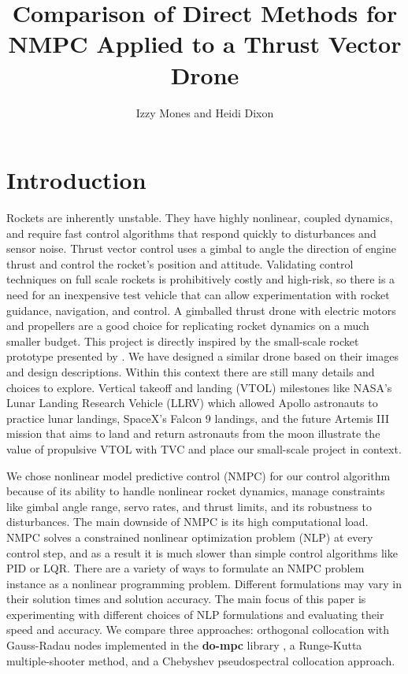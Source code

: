 \documentclass[]{article}
\title{Comparison of Direct Methods for NMPC  Applied to  a Thrust Vector Drone}
\author{Izzy Mones and Heidi Dixon}
\begin{document}
\maketitle
	
	\section*{Introduction}	
		Rockets are inherently unstable. They have highly nonlinear, coupled dynamics,  and require fast control algorithms that respond quickly to disturbances and sensor noise. Thrust vector control uses a gimbal to angle the direction of engine thrust and control the rocket's position and attitude. Validating control techniques on full scale rockets is prohibitively costly and high-risk, so there is a need for an inexpensive test vehicle that can allow experimentation with rocket guidance, navigation, and control. A gimballed thrust drone with electric motors and propellers are a good choice for replicating rocket dynamics on a much smaller budget. This project is directly inspired by the small-scale rocket prototype presented by \cite{TVCDrone}. We have designed a similar drone based on their images and design descriptions. Within this context there are still many details and choices to explore. 
		Vertical takeoff and landing (VTOL) milestones like NASA's Lunar Landing Research Vehicle (LLRV) which allowed Apollo astronauts to practice lunar landings, SpaceX's Falcon 9 landings, and the future Artemis III mission that aims to land and return astronauts from the moon illustrate the value of propulsive VTOL with TVC and place our small-scale project in context.
		
		We chose nonlinear model predictive control (NMPC) for our control algorithm because of its ability to handle nonlinear rocket dynamics, manage constraints like gimbal angle range, servo rates, and thrust limits, and its robustness to disturbances. The main downside of NMPC is its high computational load. NMPC solves a constrained nonlinear optimization  problem (NLP) at every control step, and as a result it is much slower than simple control algorithms like PID or LQR.
		There are a variety of ways to formulate an NMPC problem instance as a nonlinear programming problem. Different formulations may vary in their solution times and solution accuracy.
		The main focus of this paper is experimenting with different choices of NLP formulations and evaluating their speed and accuracy. We  compare three approaches: orthogonal collocation with Gauss-Radau nodes implemented in the {\bf do-mpc}  library \citep{do-mpc}, a Runge-Kutta multiple-shooter method, and a Chebyshev pseudospectral collocation approach.
\end{document}

